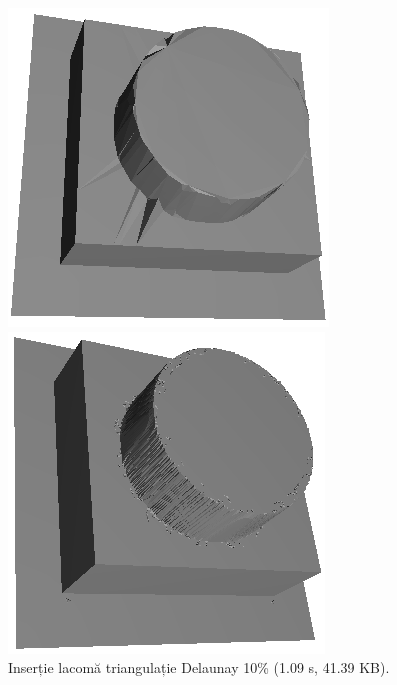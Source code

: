 \documentclass[12pt]{article}
\begin{document}
\begin{figure}[!htb]
	\begin{minipage}{0.24\textwidth}
		\centering
		\includegraphics[width=.95\linewidth]{Turn/TurnDelaunay10.png}
		\caption{Inserție lacomă triangulație Delaunay 10\% (1.09 s, 41.39 KB).}\label{fig:fig21}
	\end{minipage}\hfill
        \begin{minipage}{0.24\textwidth}
		\centering
		\includegraphics[width=.95\linewidth]{Turn/TurnDelaunay001.png}

\end{minipage}
\end{figure}
\end{document}

